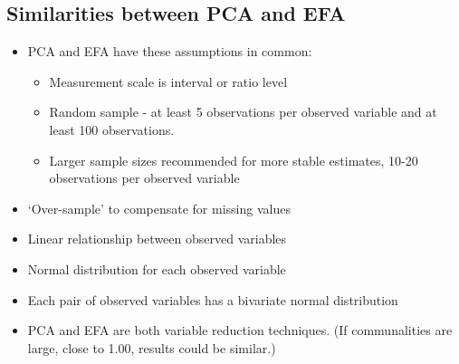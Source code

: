 \documentclass[a4paper,12pt]{article}
\begin{document}
\subsection{Similarities between PCA and EFA}
\begin{itemize}
\item PCA and EFA have these assumptions in common:
\begin{itemize}
\item Measurement scale is interval or ratio level
\item Random sample - at least 5 observations per observed variable and at least 100 observations.
\item Larger sample sizes recommended for more stable estimates, 10-20 observations per observed variable
\end{itemize}
\item `Over-sample' to compensate for missing values
\item Linear relationship between observed variables
\item Normal distribution for each observed variable
\item Each pair of observed variables has a bivariate normal distribution
\item PCA and EFA are both variable reduction techniques. (If communalities are large, close to 1.00, results could be similar.)
\end{itemize}
\end{document}
